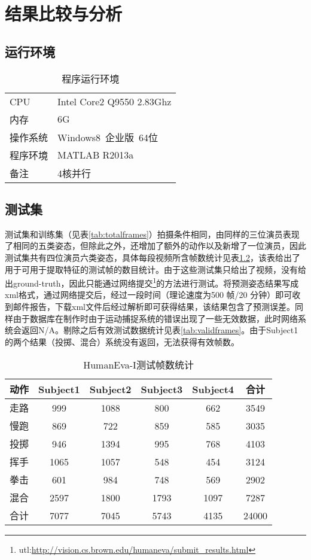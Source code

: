 

\chapter{结果比较与分析}

\section{运行环境}
\begin{table}[htbp]
  \centering
  \caption{程序运行环境}
  \label{tab:sysenr}
    \begin{tabular}{p{6em}|l}
      \toprule[1.5pt]
      CPU & Intel Core2 Q9550 2.83Ghz\\
      内存 & 6G\\
      操作系统 & Windows8\ 企业版\ 64位\\
      程序环境 & MATLAB R2013a\\
      备注 & 4核并行\\
      \bottomrule[1.5pt]
    \end{tabular}
\end{table}

\section{测试集}
测试集和训练集（见表\ref{tab:totalframes}）拍摄条件相同，由同样的三位演员表现了相同的五类姿态，但除此之外，还增加了额外的动作以及新增了一位演员，因此测试集共有四位演员六类姿态，具体每段视频所含帧数统计见表\ref{tab:testframes}，该表给出了用于可用于提取特征的测试帧的数目统计。由于这些测试集只给出了视频，没有给出ground-truth，因此只能通过网络提交\footnote{utl:\url{http://vision.cs.brown.edu/humaneva/submit_results.html}}的方法进行测试。将预测姿态结果写成xml格式，通过网络提交后，经过一段时间（理论速度为500 帧/20 分钟）即可收到邮件报告，下载xml文件后经过解析即可获得结果，该结果包含了预测误差。同样由于数据库在制作时由于运动捕捉系统的错误出现了一些无效数据，此时网络系统会返回N/A。剔除之后有效测试数据统计见表\ref{tab:validframes}。由于Subject1的两个结果（投掷、混合）系统没有返回，无法获得有效帧数。

\begin{table}[H]
  \centering
  \caption{HumanEva-I测试帧数统计}
  \label{tab:testframes}
    \begin{tabular}{lccccc}
      \toprule[1.5pt]
      动作 & Subject1 & Subject2 & Subject3 & Subject4 & 合计 \\\midrule[1pt]
      走路 & 999 & 1088 & 800 & 662 & 3549\\
      慢跑 & 869 & 722 & 859 & 585 & 3035\\
      投掷 & 946 & 1394 & 995 & 768 & 4103\\
      挥手 & 1065 & 1057 & 548 & 454 & 3124\\
      拳击 & 601 & 984 & 748 & 569 & 2902\\
      混合 & 2597 & 1800 & 1793 & 1097 & 7287\\
      合计 & 7077 & 7045 & 5743 & 4135 & 24000\\
      \bottomrule[1.5pt]
    \end{tabular}
\end{table}

